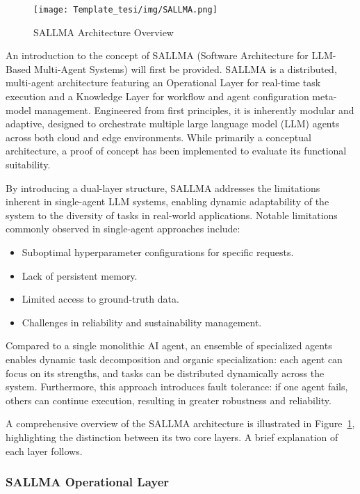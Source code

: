 \begin{figure}[h] 
    \centering
    \texttt{[image: Template\_tesi/img/SALLMA.png]}
    \caption{SALLMA Architecture Overview}
    \label{fig:SALLMA}
\end{figure}
An introduction to the concept of SALLMA (Software Architecture for LLM-Based Multi-Agent Systems) will first be provided.
SALLMA  is a distributed, multi-agent architecture featuring an Operational Layer for real-time task execution and a Knowledge Layer for workflow and agent configuration meta-model management. Engineered from first principles, it is inherently modular and adaptive, designed to orchestrate multiple large language model (LLM) agents across both cloud and edge environments. While primarily a conceptual architecture, a proof of concept has been implemented to evaluate its functional suitability. 


By introducing a dual-layer structure, SALLMA addresses the limitations inherent in single-agent LLM systems, enabling dynamic adaptability of the system to the diversity of tasks in real-world applications. Notable limitations commonly observed in single-agent approaches include:

\begin{itemize}[leftmargin=*, label=--]
    \item Suboptimal hyperparameter configurations for specific requests.
    \item Lack of persistent memory.
    \item Limited access to ground-truth data.
    \item Challenges in reliability and sustainability management.
\end{itemize}

Compared to a single monolithic AI agent, an ensemble of specialized agents enables dynamic task decomposition and organic specialization: each agent can focus on its strengths, and tasks can be distributed dynamically across the system. Furthermore, this approach introduces fault tolerance: if one agent fails, others can continue execution, resulting in greater robustness and reliability.

A comprehensive overview of the SALLMA architecture is illustrated in Figure~\ref{fig:SALLMA}, highlighting the distinction between its two core layers. A brief explanation of each layer follows.

\subsubsection{SALLMA Operational Layer}

